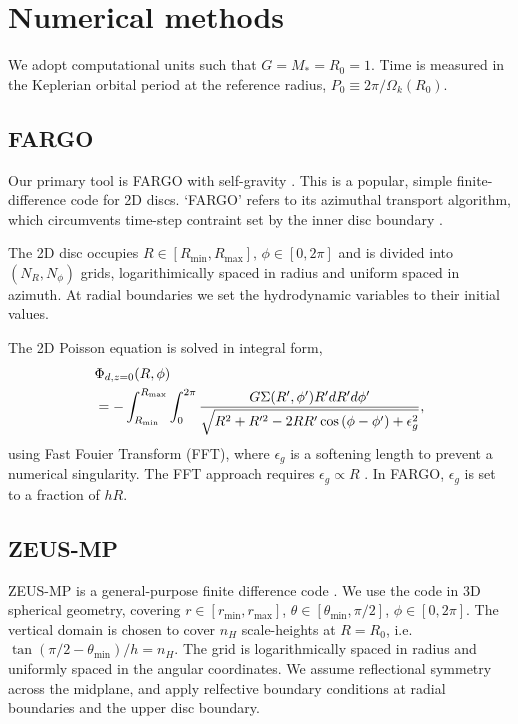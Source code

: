 \section{Numerical methods}
We adopt computational units such that $G=M_*=R_0=1$. Time is measured
in the Keplerian orbital period at the reference radius, $P_0\equiv 
2\pi/\Omega_k(R_0)$.  

\subsection{FARGO}
Our primary tool is FARGO with self-gravity \citep{baruteau08}. This
is a popular, simple finite-difference code for 2D discs. `FARGO' refers
to its azimuthal transport algorithm, which circumvents time-step
contraint set by the inner disc boundary \citep{masset00a,masset00b}. 

The 2D disc occupies
$R\in[R_\mathrm{min},R_\mathrm{max}],\,\phi\in[0,2\pi]$ and is 
divided into $(N_R,N_\phi)$ grids, logarithimically spaced in radius and
uniform spaced in azimuth. At radial boundaries we set the
hydrodynamic variables to their initial values.   

The 2D Poisson equation is solved in integral form, 
\begin{align}\label{2d_grav}
  &\Phi_{d,z=0}(R,\phi) \notag \\
  &=-\int_{R_\mathrm{min}}^{R_\mathrm{max}} \int_0^{2\pi}
  \frac{G\Sigma(R^\prime,\phi^\prime)R^\prime dR^\prime d\phi^\prime}{\sqrt{R^2+R^{\prime 2} -
      2RR^\prime\cos{(\phi - \phi^\prime)} + \epsilon_g^2}}, 
\end{align}
using Fast Fouier Transform (FFT), where $\epsilon_g$ is a softening
length to prevent a numerical singularity. The FFT approach requires
$\epsilon_g\propto R$ \citep{baruteau08}. In FARGO, $\epsilon_g$ is
set to a fraction of $hR$.  

\subsection{ZEUS-MP}
ZEUS-MP  is a general-purpose finite difference
code \citep{hayes06}. We use the code in 3D spherical geometry, covering
$r\in[r_\mathrm{min},r_\mathrm{max}]$, $\theta\in[\theta_\mathrm{min},\pi/2]$,
$\phi\in[0,2\pi]$. The vertical domain is chosen to cover $n_H$
scale-heights at $R=R_0$, i.e. $\tan{(\pi/2 - \theta_\mathrm{min})}/h=n_H$. 
The grid is logarithmically spaced in radius and uniformly spaced in the angular
coordinates. We assume reflectional symmetry across the midplane, and
apply relfective boundary conditions at radial boundaries and the
upper disc boundary.  

